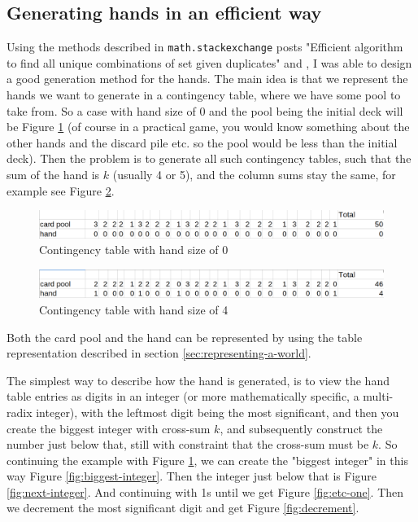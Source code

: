 \subsection{Generating hands in an efficient way} \label{sec:efficient-generation-of-hands}
Using the methods described in {\tt math.stackexchange} posts "Efficient algorithm to find all unique combinations of set given duplicates" \cite{HardmathcontigencyTablePost} and \cite{GCabrecursiveGenerationPost}, I was able to design a good generation method for the hands.
The main idea is that we represent the hands we want to generate in a contingency table, where we have some pool to take from.
So a case with hand size of 0 and the pool being the initial deck will be Figure \ref{fig:hand-pool-table} (of course in a practical game, you would know something about the other hands and the discard pile etc. so the pool would be less than the initial deck).
Then the problem is to generate all such contingency tables, such that the sum of the hand is $k$ (usually 4 or 5), and the column sums stay the same, for example see Figure \ref{fig:hand-pool-table-with-hand}.

\begin{figure}
	\centering
\includegraphics[width=13cm,frame]{images/contigency_table.png}
	\caption{Contingency table with hand size of 0}
	\label{fig:hand-pool-table}
\end{figure}


\begin{figure}
	\centering
\includegraphics[width=13cm,frame]{images/contigency_table_with_hand.png}
	\caption{Contingency table with hand size of 4}
	\label{fig:hand-pool-table-with-hand}
\end{figure}

Both the card pool and the hand can be represented by using the table representation described in section \ref{sec:representing-a-world}.

The simplest way to describe how the hand is generated, is to view the hand table entries as digits in an integer (or more mathematically specific, a multi-radix integer), with the leftmost digit being the most significant, and then you create the biggest integer with cross-sum $k$, and subsequently construct the number just below that, still with constraint that the cross-sum must be $k$.
So continuing the example with Figure \ref{fig:hand-pool-table}, we can create the "biggest integer" in this way Figure \ref{fig:biggest-integer}.
Then the integer just below that is Figure \ref{fig:next-integer}.
And continuing with 1s until we get Figure \ref{fig:etc-one}.
Then we decrement the most significant digit and get Figure \ref{fig:decrement}.

